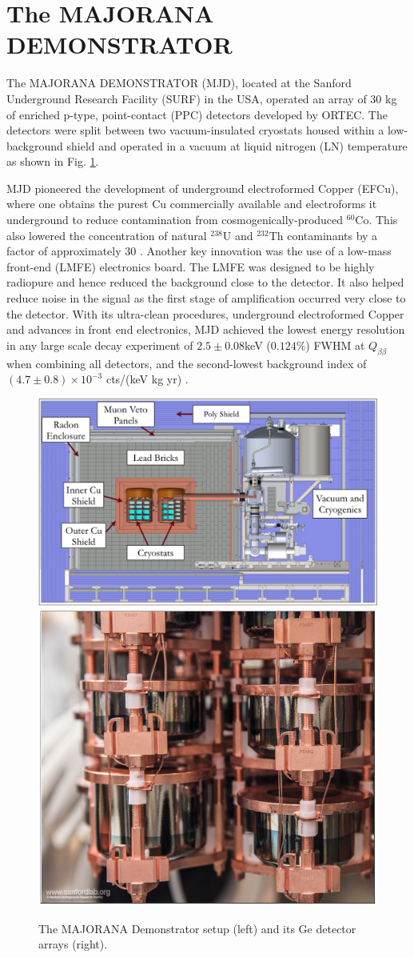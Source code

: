 

\section{The MAJORANA DEMONSTRATOR}

The MAJORANA DEMONSTRATOR (MJD), located at the Sanford Underground Research Facility (SURF) in the USA, operated an array of 30 kg of enriched p-type, point-contact (PPC) detectors developed by ORTEC. The detectors were split between two vacuum-insulated cryostats housed within a low-background shield and operated in a vacuum at liquid nitrogen (LN) temperature as shown in Fig. \ref{fig:mjd}. 

MJD pioneered the development of underground electroformed Copper (EFCu), where one obtains the purest Cu commercially available and electroforms it underground to reduce contamination from cosmogenically-produced $^{60}$Co. This also lowered the concentration of natural $^{238}$U and $^{232}$Th contaminants by a factor of approximately 30 \cite{Abgrall:2016cct}. Another key innovation was the use of a low-mass front-end (LMFE) electronics board. The LMFE was designed to be highly radiopure and hence reduced the background close to the detector. It also helped reduce noise in the signal as the first stage of amplification occurred very close to the detector. With its ultra-clean procedures, underground electroformed Copper and advances in front end electronics, MJD achieved the lowest energy resolution in any large scale {\onbb} decay experiment of $2.5\pm0.08$keV ($0.124\%$) FWHM at $Q_{\beta\beta}$ when combining all detectors, and the second-lowest background index of $(4.7\pm 0.8) \times 10^{-3}$ cts/(keV kg yr) \cite{Majorana_2019nbd}.

\begin{figure}
  \centering
  \includegraphics[height=0.342\columnwidth]{ch2/figs/mjd_setup.png}
  \qquad
  \includegraphics[height=0.345\columnwidth]{ch2/figs/mjd_ppc_array.png}
  \caption{The MAJORANA Demonstrator setup (left) and its Ge detector arrays (right).}
    \label{fig:mjd}
  \end{figure}
 
